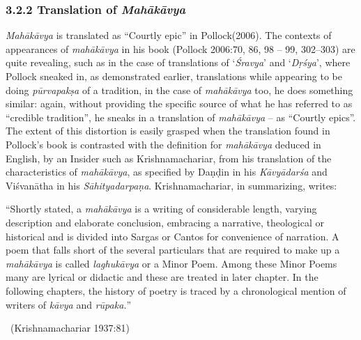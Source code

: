 \subsubsection*{3.2.2 Translation of \textit{Mahākāvya}}

\textit{Mahākāvya} is translated as “Courtly epic” in Pollock(2006). The contexts of appearances of \textit{mahākāvya} in his book (Pollock 2006:70, 86, 98 – 99, 302–303) are quite revealing, such as in the case of translations of ‘\textit{Śravya}’ and ‘\textit{Dṛśya}’, where Pollock sneaked in, as demonstrated earlier, translations while appearing to be doing \textit{pūrvapakṣa} of a tradition, in the case of \textit{mahākāvya} too, he does something similar: again, without providing the specific source of what he has referred to as “credible tradition”, he sneaks in a translation of \textit{mahākāvya} – as “Courtly epics”. The extent of this distortion is easily grasped when the translation found in Pollock’s book is contrasted with the definition for \textit{mahākāvya} deduced in English, by an Insider such as Krishnamachariar, from his translation of the characteristics of \textit{mahākāvya}, as specified by Daṇḍin in his \textit{Kāvyādarśa} and Viśvanātha in his \textit{Sāhityadarpaṇa}. Krishnamachariar, in summarizing, writes:

\begin{myquote}
“Shortly stated, a \textit{mahākāvya} is a writing of considerable length, varying description and elaborate conclusion, embracing a narrative, theological or historical and is divided into Sargas or Cantos for convenience of narration. A poem that falls short of the several particulars that are required to make up a \textit{mahākāvya} is called \textit{laghukāvya} or a Minor Poem. Among these Minor Poems many are lyrical or didactic and these are treated in later chapter. In the following chapters, the history of poetry is traced by a chronological mention of writers of \textit{kāvya} and \textit{rūpaka.}” 

~\hfill (Krishnamachariar 1937:81)
\end{myquote}


